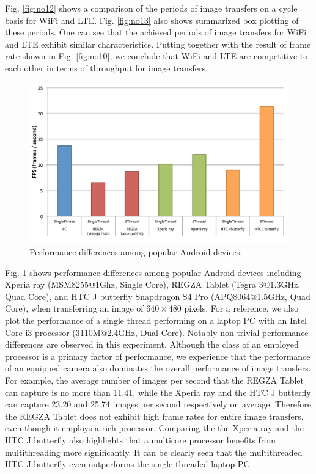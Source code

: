 Fig. \ref{fig:no12} shows a comparison of the periods of image transfers
on a cycle basis for WiFi and LTE.
Fig. \ref{fig:no13} also shows summarized box plotting of these periods.
One can see that the achieved periods of image transfers for WiFi and
LTE exhibit similar characteristics.
Putting together with the result of frame rate shown in
Fig. \ref{fig:no10}, we conclude that WiFi and LTE are competitive to
each other in terms of throughput for image transfers.

\begin{figure}[!t]
 \centering
 \includegraphics[width=0.8\hsize]{fig/No14_Android_and_PC_benchmarck.pdf}
 \caption{Performance differences among popular Android devices.}
 \label{fig:no14}
\end{figure}

Fig. \ref{fig:no14} shows performance differences among popular Android
devices including Xperia ray (MSM8255@1Ghz, Single Core),
REGZA Tablet (Tegra 3@1.3GHz, Quad Core), and HTC J butterfly Snapdragon
S4 Pro (APQ8064@1.5GHz, Quad Core), when transferring an image of
$640\times480$ pixels.
For a reference, we also plot the performance of a single thread
performing on a laptop PC with an Intel Core i3 processor (3110M@2.4GHz,
Dual Core).
Notably non-trivial performance differences are observed in this
experiment.
Although the class of an employed processor is a primary factor of
performance, we experience that the performance of an equipped camera
also dominates the overall performance of image transfers.
For example, the average number of images per second that the REGZA
Tablet can capture is no more than 11.41, while the Xperia ray and the
HTC J butterfly can capture 23.20 and 25.74 images per second
respectively on average.
Therefore the REGZA Tablet does not exhibit high frame rates for entire
image transfers, even though it employs a rich processor.
Comparing the the Xperia ray and the HTC J butterfly also highlights
that a multicore processor benefits from multithreading more
significantly.
It can be clearly seen that the multithreaded HTC J butterfly even
outperforms the single threaded laptop PC.